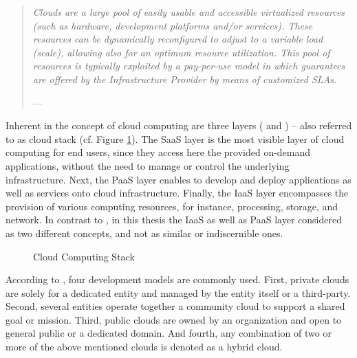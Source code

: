 \begin{quotation}{\slshape 
Clouds are a large pool of easily usable and accessible virtualized resources (such as hardware, development platforms and/or services). These resources can be dynamically reconfigured to adjust to a variable load (scale), allowing also for an optimum resource utilization. This pool of resources is typically exploited by a pay-per-use model in which guarantees are offered by the Infrastructure Provider by means of customized \acp{SLA}.}
\vspace*{-7pt}
\begin{flushright}
	--- \citealp[p. 51]{Vaquero2009}
\end{flushright}
\end{quotation}

Inherent in the concept of cloud computing are three layers (\citealp[pp. 118-119]{Iyer2010} and \citealp[pp. 2-3]{Mell2011}) -- also referred to as cloud stack (cf. Figure \ref{fig:ccs}). The \ac{SaaS} layer is the most visible layer of cloud computing for end users, since they access here the provided on-demand applications, without the need to manage or control the underlying infrastructure. Next, the \ac{PaaS} layer enables to develop and deploy applications as well as services onto cloud infrastructure. Finally, the \ac{IaaS} layer encompasses the provision of various computing resources, for instance, processing, storage, and network. In contrast to \citet[p.50]{Armbrust2010}, in this thesis the \ac{IaaS} as well as \ac{PaaS} layer considered as two different concepts, and not as similar or indiscernible ones. 

\begin{figure}[htb]
	\centering
	
	\caption{Cloud Computing Stack}
	\label{fig:ccs}
\end{figure}

According to \citet[p. 3]{Mell2011}, four development models are commonly used. First, private clouds are solely for a dedicated entity and managed by the entity itself or a third-party. Second, several entities operate together a community cloud to support a shared goal or mission. Third, public clouds are owned by an organization and open to general public or a dedicated domain. And fourth, any combination of two or more of the above mentioned clouds is denoted as a hybrid cloud.

